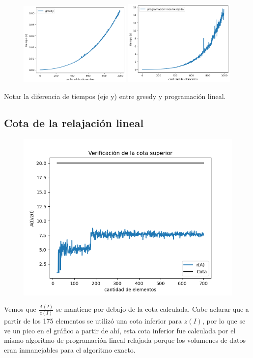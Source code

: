 \begin{figure}[H]
    \centering
    \includegraphics[width=0.49\textwidth]{img/greedy.png}
    \includegraphics[width=0.49\textwidth]{img/pl_rlx.png}
\end{figure}

Notar la diferencia de tiempos (eje y) entre greedy y programación lineal.

\subsection{Cota de la relajaci\'on lineal}

\begin{figure}[H]
    \centering
    \includegraphics[width=1\textwidth]{img/cota.png}
\end{figure}

Vemos que $\frac{A(I)}{z(I)}$ se mantiene por debajo de la cota calculada. Cabe
aclarar que a partir de los 175 elementos se utiliz\'o una cota inferior para
$z(I)$, por lo que se ve un pico en el gr\'afico a partir de ah\'i, esta cota
inferior fue calculada por el mismo algoritmo de programaci\'on lineal relajada
porque los volumenes de datos eran inmanejables para el algoritmo exacto.
